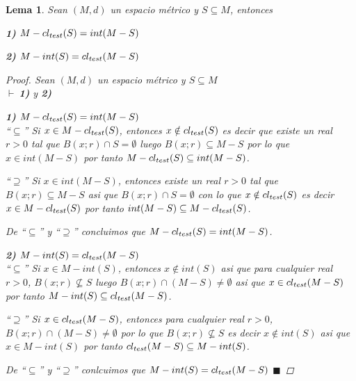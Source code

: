 \documentclass[oneside]{book} %
\theoremstyle{Teorema}
\newtheorem{Lema}[Definicion]{Lema}
\theoremstyle{Ejemplos}
\theoremstyle{[Obs]}
\def \test {test}
\newcommand{\cerradura}[2][\test]{\ifx \test #1 {\overline{#2}} \else {cl_{#1}(#2)} \fi} %
\renewcommand{\{}{\left\lbrace} %
\renewcommand{\}}{\right\rbrace} %
\newcommand{\n}{\cap} %
\renewcommand{\sc}{\subseteq} %
\renewcommand{\qed}{$\blacksquare$} %
\newcommand{\pd}{$\vdash\ $} %
\begin{document}
			\begin{Lema}\setlength{\parindent}{0em}
			
				Sean $(M, d)$ un espacio métrico y $S \sc M$, entonces 

				\textbf{1)} $M - \cerradura{S} = int(M - S)$

				\textbf{2)} $M - int(S) = \cerradura{M - S}$

				\begin{proof}
					
					Sean $(M, d)$ un espacio métrico y $S \sc M$ \\ 
					\pd \textbf{1)} y \textbf{2)}

					\textbf{1)} $M - \cerradura{S} = int(M - S)$ \\ 
					``$\sc$'' Si $x \in M - \cerradura{S}$, entonces $x \notin \cerradura{S}$ es decir que existe un real $r > 0$ tal que $B(x;r) \n S = \emptyset$ luego $B(x;r) \sc M - S$ por lo que $x \in int(M - S)$ por tanto $M - \cerradura{S} \sc int(M - S)$.

					``$\supseteq$'' Si $x \in int(M - S)$, entonces existe un real $r > 0$ tal que $B(x;r) \sc M - S$ asi que $B(x;r) \n S = \emptyset$ con lo que $x \notin \cerradura{S}$ es decir $x \in M - \cerradura{S}$ por tanto $int(M - S) \sc M - \cerradura{S}$.

					De ``$\sc$'' y ``$\supseteq$'' concluimos que $M - \cerradura{S} = int(M - S)$. 

					\textbf{2)} $M - int(S) = \cerradura{M - S}$ \\ 
					``$\sc$'' Si $x \in M - int(S)$, entonces $x \notin int(S)$ asi que para cualquier real $r > 0$, $B(x;r) \nsubseteq S$ luego $B(x;r) \n (M - S) \neq \emptyset$ asi que $x \in \cerradura{M - S}$ por tanto $M - int(S) \sc \cerradura{M - S}$. 

					``$\supseteq$'' Si $x \in \cerradura{M - S}$, entonces para cualquier real $r > 0$, $B(x;r) \n (M - S) \neq \emptyset$ por lo que $B(x;r) \nsubseteq S$ es decir $x \notin int(S)$ asi que $x \in M - int(S)$ por tanto $\cerradura{M - S} \sc M - int(S)$.

					De ``$\sc$'' y ``$\supseteq$'' conlcuimos que $M - int(S) = \cerradura{M - S}$ \qed 

				\end{proof}
			
			\end{Lema}
\end{document}
